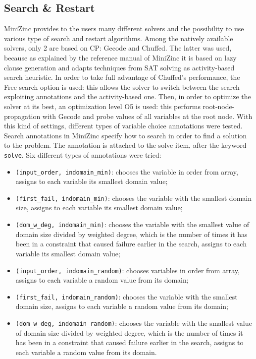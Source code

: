 \documentclass[a4paper, 12pt]{article}
\begin{document}
 
\subsection{Search \& Restart}
MiniZinc provides to the users many different solvers and the possibility to use various type of search and restart algorithms. Among the natively available solvers, only 2 are based on CP: Gecode and Chuffed. The latter was used, because as explained by the reference manual of MiniZinc it is based on lazy clause generation and adapts techniques from SAT solving as activity-based search heuristic. In order to take full advantage of Chuffed’s performance, the Free search option is used: this allows the solver to switch between the search exploiting annotations and the activity-based one. Then, in order to optimize the solver at its best, an optimization level O5 is used: this performs root-node-propagation with Gecode and probe values of all variables at the root node. With this kind of settings, different types of variable choice annotations were tested. Search annotations in MiniZinc specify how to search in order to find a solution to the problem. The annotation is attached to the solve item, after the keyword \verb|solve|. Six different types of annotations were tried:
\begin{itemize}
	\item \verb|(input_order, indomain_min)|: chooses the variable in order from array, assigns to each variable its smallest domain value;
	\item \verb|(first_fail, indomain_min)|: chooses the variable with the smallest domain size, assigns to each variable its smallest domain value;
	\item \verb|(dom_w_deg, indomain_min)|: chooses the variable with the smallest value of domain size divided by weighted degree, which is the number of times it has been in a constraint that caused failure earlier in the search, assigns to each variable its smallest domain value;
	\item \verb|(input_order, indomain_random)|: chooses variables in order from array, assigns to each variable a random value from its domain;
	\item \verb|(first_fail, indomain_random)|: chooses the variable with the smallest domain size, assigns to each variable a random value from its domain;
	\item \verb|(dom_w_deg, indomain_random)|: chooses the variable with the smallest value of domain size divided by weighted degree, which is the number of times it has been in a constraint that caused failure earlier in the search, assigns to each variable a random value from its domain.
\end{itemize}
\end{document}
